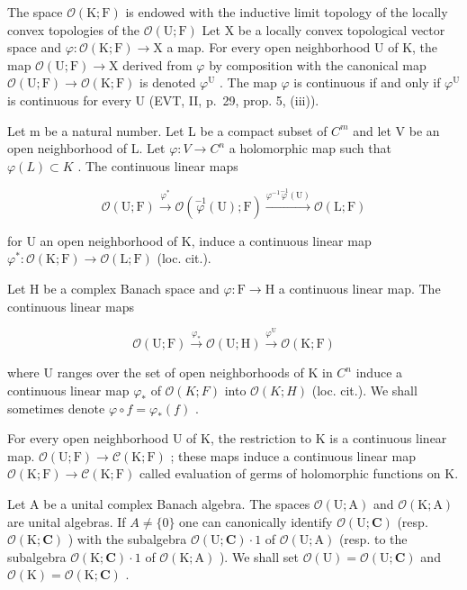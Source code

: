 The space \(\mathcal{O}(\mathrm{K};\mathrm{F})\) is endowed with the inductive limit topology of the locally convex topologies of the \(\mathcal{O}(\mathrm{U};\mathrm{F})\) Let X be a locally convex topological vector space and \(\varphi\colon\mathcal{O}(\mathrm{K};\mathrm{F})\to\mathrm{X}\) a map. For every open neighborhood U of K, the map \(\mathcal{O}(\mathrm{U};\mathrm{F})\to\mathrm{X}\) derived from \(\varphi\) by composition with the canonical map \(\mathcal{O}(\mathrm{U};\mathrm{F})\to\mathcal{O}(\mathrm{K};\mathrm{F})\) is denoted \(\varphi^{\mathrm{U}}\) . The map \(\varphi\) is continuous if and only if \(\varphi^{\mathrm{U}}\) is continuous for every U (EVT, II, p.~29, prop. 5, (iii)).

Let m be a natural number. Let L be a compact subset of \(C^{m}\) and let V be an open neighborhood of L. Let \(\varphi\colon V \to C^{n}\) a holomorphic map such that \(\varphi(L) \subset K\) . The continuous linear maps

\[
\mathcal {O} (\mathrm{U}; \mathrm{F}) \xrightarrow {\varphi^ {*}} \mathcal {O} (\stackrel {- 1} {\varphi} (\mathrm{U}); \mathrm{F}) \xrightarrow {\varphi^ {- 1} \stackrel {- 1} {\varphi} (\mathrm{U})} \mathcal {O} (\mathrm{L}; \mathrm{F})
\]

for U an open neighborhood of K, induce a continuous linear map \(\varphi^{*}\colon\mathcal{O}(\mathrm{K};\mathrm{F})\to\mathcal{O}(\mathrm{L};\mathrm{F})\) (loc. cit.).

Let H be a complex Banach space and \(\varphi\colon\mathrm{F}\to\mathrm{H}\) a continuous linear map. The continuous linear maps

\[
\mathcal {O} (\mathrm{U}; \mathrm{F}) \xrightarrow {\varphi_ {*}} \mathcal {O} (\mathrm{U}; \mathrm{H}) \xrightarrow {\varphi^ {\mathrm{U}}} \mathcal {O} (\mathrm{K}; \mathrm{F})
\]

where U ranges over the set of open neighborhoods of K in \(C^{n}\) induce a continuous linear map \(\varphi_{*}\) of \(\mathcal{O}(K;F)\) into \(\mathcal{O}(K;H)\) (loc. cit.). We shall sometimes denote \(\varphi \circ f = \varphi_{*}(f)\) .

For every open neighborhood U of K, the restriction to K is a continuous linear map. \(\mathcal{O}(\mathrm{U};\mathrm{F})\to \mathcal{C}(\mathrm{K};\mathrm{F})\) ; these maps induce a continuous linear map \(\mathcal{O}(\mathrm{K};\mathrm{F})\to \mathcal{C}(\mathrm{K};\mathrm{F})\) called evaluation of germs of holomorphic functions on K.

Let A be a unital complex Banach algebra. The spaces \(\mathcal{O}(\mathrm{U};\mathrm{A})\) and \(\mathcal{O}(\mathrm{K};\mathrm{A})\) are unital algebras. If \(A \neq \{0\}\) one can canonically identify \(\mathcal{O}(\mathrm{U};\mathbf{C})\) (resp. \(\mathcal{O}(\mathrm{K};\mathbf{C})\) ) with the subalgebra \(\mathcal{O}(\mathrm{U};\mathbf{C}) \cdot 1\) of \(\mathcal{O}(\mathrm{U};\mathrm{A})\) (resp. to the subalgebra \(\mathcal{O}(\mathrm{K};\mathbf{C}) \cdot 1\) of \(\mathcal{O}(\mathrm{K};\mathrm{A})\) ). We shall set \(\mathcal{O}(\mathrm{U}) = \mathcal{O}(\mathrm{U};\mathbf{C})\) and \(\mathcal{O}(\mathrm{K}) = \mathcal{O}(\mathrm{K};\mathbf{C})\) .

